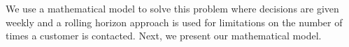 \documentclass[11pt]{article}
\begin{document}



We use a mathematical model to solve this problem where decisions are given weekly and a rolling horizon approach is used for limitations on the number of times a customer is contacted. Next, we present our mathematical model. 



\end{document}
